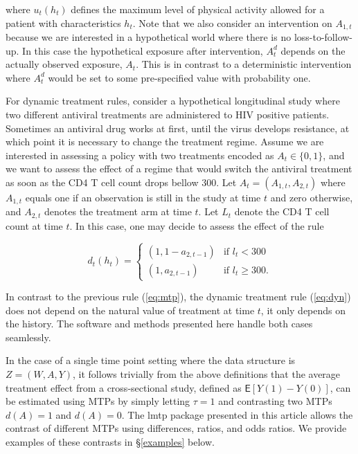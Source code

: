 \documentclass[twoside,11pt]{article}
\newcommand{\pkg}[1]{{\fontseries{b}\selectfont #1}}
\newcommand{\E}{\mathsf{E}}
\begin{document}
where $u_t(h_t)$ defines the maximum level of physical activity allowed for a patient with characteristics $h_t$. Note that we also consider an intervention on $A_{1,t}$ because we are interested in a hypothetical world where there is no loss-to-follow-up. In this case the hypothetical exposure after intervention, $A^{d}_t$ depends on the actually observed exposure, $A_t$. This is in contrast to a deterministic intervention where $A^{d}_t$ would be set to some pre-specified value with probability one.

For dynamic treatment rules, consider a hypothetical longitudinal study where two different antiviral treatments are administered to HIV positive patients. Sometimes an antiviral drug works at first, until the virus develops resistance, at which point it is necessary to change the treatment regime. Assume we are interested in assessing a policy with two treatments encoded as $A_t\in \{0,1\}$, and we want to assess the effect of a regime that would switch the antiviral treatment as soon as the CD4 T cell count drops bellow 300. Let $A_t = (A_{1, t}, A_{2, t})$ where $A_{1, t}$ equals one if an observation is still in the study at time $t$ and zero otherwise, and $A_{2, t}$ denotes the treatment arm at time $t$. Let $L_t$ denote the CD4 T cell count at time $t$. In this case, one may decide to assess the effect of the rule

\begin{equation}\label{eq:dyn}
  d_t(h_t)=
  \begin{cases}
    (1, 1 - a_{2,t-1}) & \text{if } l_t < 300  \\
    (1, a_{2,t-1}) & \text{if } l_t  \geq 300.
  \end{cases}
\end{equation}

In contrast to the previous rule (\ref{eq:mtp}), the dynamic treatment rule (\ref{eq:dyn}) does not depend on the natural value of treatment at time $t$, it only depends on the history. The software and methods presented here handle both cases seamlessly.

In the case of a single time point setting where the data structure is $Z=(W,A,Y)$, it follows trivially from the above definitions that the average treatment effect from a cross-sectional study, defined as $\E[Y(1) - Y(0)]$, can be estimated using MTPs by simply letting $\tau = 1$ and contrasting two MTPs $d(A)=1$ and $d(A)=0$. The \pkg{lmtp} package presented in this article allows the contrast of different MTPs using differences, ratios, and odds ratios. We provide examples of these contrasts in \S \ref{examples} below.
\end{document}
